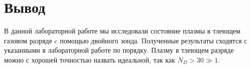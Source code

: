 \documentclass[a4paper,12pt]{article}
\begin{document}
\section{\Large{Вывод}}
В данной лабораторной работе мы исследовали состояние плазмы в тлеющем газовом разряде c помощью двойного зонда. Полученные результаты сходятся с указанными в лабораторной работе по порядку. Плазму в тлеющем разряде можно с хорошей точностью назвать идеальной, так как $N_D > 30 \gg 1$.
\end{document}

